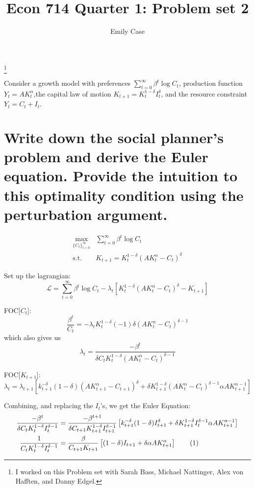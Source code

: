 \documentclass[12pt,oneside,reqno]{amsart}
\title{Econ 714 Quarter 1: Problem set 2 }
\author{Emily Case}
\newcommand\blfootnote[1]{%
	\begingroup
	\renewcommand\thefootnote{}\footnote{#1}%
	\addtocounter{footnote}{-1}%
	\endgroup
}
\newcommand{\sumti}{\sum\limits_{t=0}^\infty} %
\newcommand\numberthis{\addtocounter{equation}{1}\tag{\theequation}} %
\begin{document}
	
	\maketitle
	
	\blfootnote{I worked on this Problem set with Sarah Bass, Michael Nattinger, Alex von Hafften, and Danny Edgel.} 



Consider a growth model with preferences $\sumti \beta^t\log C_t$, production function $Y_t=AK_t^\alpha$,the capital law of motion $K_{t+1}=K_{t}^{1-\delta}I_t^\delta$, and the resource constraint $Y_t=C_t+I_t$.

\section{Write down the social planner’s problem and derive the Euler equation. Provide the intuition to this optimality condition using the perturbation argument.} 

\begin{align*}
\max_{\{C_t\}_{t=0}^\infty} & \sumti \beta^t \log C_t 
\\
\text{s.t.}\; & K_{t+1}
 = K_t^{1-\delta}(AK_t^\alpha-C_t)^\delta
\end{align*}


Set up the lagrangian:
\[ \mathcal{L} = 
\sumti \beta^t \log C_t -\lambda_t 
[K_t^{1-\delta}(AK_t^\alpha -C_t)^\delta -K_{t+1} ]\]

FOC[$C_t$]:
\[\frac{\beta^t}{C_t} = -\lambda_t K_t^{1-\delta}(-1)\delta(AK_t^\alpha-C_t)^{\delta-1}
\]
which also gives us 
\[ \lambda_t = \frac{-\beta^t}{\delta C_t K_t^{1-\delta}(AK_t^\alpha-C_t)^{\delta-1}}\]

FOC[$K_{t+1}$]:
\[\lambda_t = \lambda_{t+1} [
k_{t+1}^{-\delta}(1-\delta)(AK_{t+1}^\alpha-C_{t+1})^\delta + 
\delta K_{t+1}^{1-\delta}(AK_t^\alpha -C_t)^{\delta-1}\alpha AK_{t+1}^{\alpha-1}]
\]


Combining, and replacing the $I_t$'s, we get the Euler Equation: 
\begin{align*}
\frac{-\beta^t}{\delta C_t K_t^{1-\delta}I_t^{\delta-1}} 
& = \frac{-\beta^{t+1}}{\delta C_{t+1} K_{t+1}^{1-\delta}I_{t+1}^{\delta-1}} 
\left[ k_{t+1}^{-\delta}(1-\delta)I_{t+1}^\delta + 
\delta K_{t+1}^{1-\delta}I_t^{\delta-1}\alpha AK_{t+1}^{\alpha-1}\right] 
\\
\frac{1}{C_tK_t^{1-\delta}I_t^{\delta-1}}
& = \frac{\beta}{C_{t+1}K_{t+1}}
\left[ (1-\delta)I_{t+1}+\delta\alpha A K_{t+1}^\alpha \right]
\numberthis \label{euler}
\end{align*}
\end{document}
